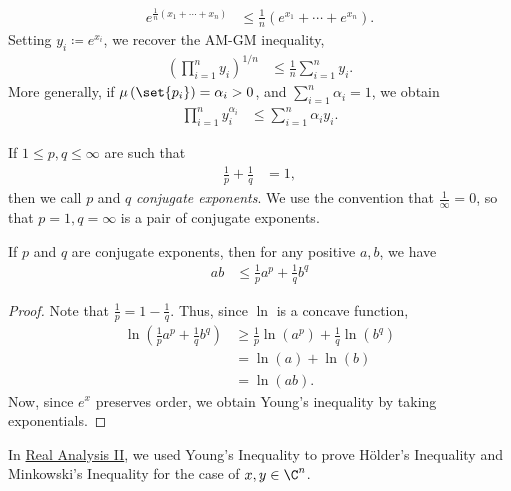 \documentclass[10pt]{mypackage}
\begin{document}
\begin{align*}
  e^{\frac{1}{n}\left( x_1 + \cdots + x_n \right)} &\leq \frac{1}{n}\left( e^{x_1} + \cdots + e^{x_n} \right).
\end{align*}
Setting $y_i\coloneq e^{x_i}$, we recover the AM-GM inequality,
\begin{align*}
  \left( \prod_{i=1}^{n}y_i \right)^{1/n} &\leq \frac{1}{n}\sum_{i=1}^{n}y_i.
\end{align*}
More generally, if $\mu\left( \set{p_i} \right) = \alpha_i > 0$, and $\sum_{i=1}^{n}\alpha_i = 1$, we obtain
\begin{align*}
  \prod_{i=1}^{n}y_i^{\alpha_i} &\leq \sum_{i=1}^{n}\alpha_iy_i.
\end{align*}
\begin{definition}
  If $1 \leq p,q \leq \infty$ are such that
  \begin{align*}
    \frac{1}{p} + \frac{1}{q} &= 1,
  \end{align*}
  then we call $p$ and $q$ \textit{conjugate exponents}. We use the convention that $\frac{1}{\infty} = 0$, so that $p=1,q=\infty$ is a pair of conjugate exponents.
\end{definition}
\begin{theorem}
  If $p$ and $q$ are conjugate exponents, then for any positive $a,b$, we have
  \begin{align*}
    ab &\leq \frac{1}{p}a^p + \frac{1}{q}b^q
  \end{align*}
\end{theorem}
\begin{proof}
  Note that $\frac{1}{p} = 1 - \frac{1}{q}$. Thus, since $\ln$ is a concave function,
  \begin{align*}
    \ln\left( \frac{1}{p}a^p + \frac{1}{q}b^{q} \right) &\geq \frac{1}{p}\ln\left( a^{p} \right) + \frac{1}{q}\ln\left( b^{q} \right)\\
                                                        &= \ln\left( a \right) + \ln\left( b \right)\\
                                                        &= \ln\left( ab \right).
  \end{align*}
  Now, since $e^{x}$ preserves order, we obtain Young's inequality by taking exponentials.
\end{proof}
In \href{https://ai.avinash-iyer.com/Classes_and_Homework/College/Y3/Y3S2,\%20Real\%20II/real_2_notes.pdf}{Real Analysis II}, we used Young's Inequality to prove Hölder's Inequality and Minkowski's Inequality for the case of $x,y\in \C^{n}$.
\end{document}
